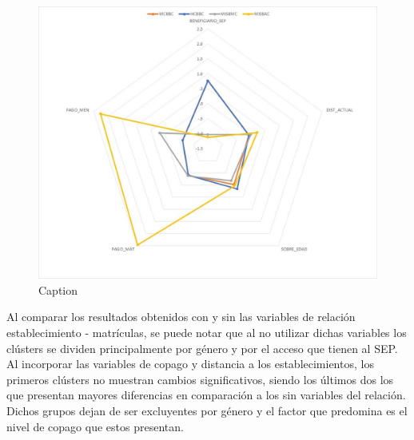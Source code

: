 \begin{figure}[H]
    \centering
    \includegraphics[width=\textwidth]{images/radar_chart_matriculas_con.jpg}
    \caption{Caption}
    \label{fig:my_label}
\end{figure}


Al comparar los resultados obtenidos con y sin las variables de relación establecimiento - matrículas, se puede notar que al no utilizar dichas variables los clústers se dividen principalmente por género y por el acceso que tienen al SEP. Al incorporar las variables de copago y distancia a los establecimientos, los primeros clústers no muestran cambios significativos, siendo los últimos dos los que presentan mayores diferencias en comparación a los sin variables del relación. Dichos grupos dejan de ser excluyentes por género y el factor que predomina es el nivel de copago que estos presentan. 

